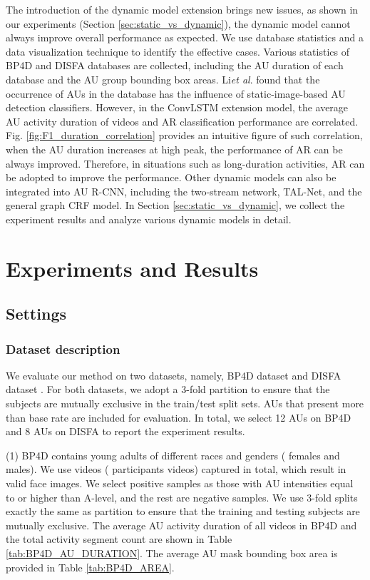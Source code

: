 \documentclass[5p,twocolumn]{elsarticle}
\newcommand{\etal}{\textit{et al}. }
\begin{document}
The introduction of the dynamic model extension brings new issues, as shown in our experiments (Section \ref{sec:static_vs_dynamic}), the dynamic model cannot always improve overall performance as expected. We use database statistics and a data visualization technique to identify the effective cases. Various statistics of BP4D and DISFA databases are collected, including the AU duration of each database and the AU group bounding box areas. Li\etal \cite{li2017eac} found that the occurrence of AUs in the database has the influence of static-image-based AU detection classifiers. However, in the ConvLSTM extension model, the average AU activity duration of videos and AR classification performance are correlated. Fig. \ref{fig:F1_duration_correlation} provides an intuitive figure of such correlation, when the AU duration increases at high peak, the performance of AR can be always improved. Therefore, in situations such as long-duration activities, AR can be adopted to improve the performance. Other dynamic models can also be integrated into AU R-CNN, including the two-stream network, TAL-Net, and the general graph CRF model. In Section  \ref{sec:static_vs_dynamic}, we collect the experiment results and analyze various dynamic models in detail. 

\section{Experiments and Results}
\label{sec:Experiment}
\subsection{Settings}
\subsubsection{Dataset description}
We evaluate our method on two datasets, namely, BP4D dataset \cite{zhang2014bp4d} and DISFA dataset \cite{mavadati2013disfa}. For both datasets, we adopt a 3-fold partition to ensure that the subjects are mutually exclusive in the train/test split sets. AUs that present more than  base rate are included for evaluation. In total, we select 12 AUs on BP4D and 8 AUs on DISFA to report the experiment results. 

(1) BP4D \cite{zhang2014bp4d} contains  young adults of different races and genders ( females and  males). We use  videos ( participants  videos) captured in total, which result in  valid face images. We select positive samples as those with AU intensities equal to or higher than A-level, and the rest are negative samples. We use 3-fold splits exactly the same as \cite{li2017eac,li2017action} partition to ensure that the training and testing subjects are mutually exclusive. The average AU activity duration of all videos in BP4D and the total activity segment count are shown in Table \ref{tab:BP4D_AU_DURATION}. The average AU mask bounding box area is provided in Table \ref{tab:BP4D_AREA}.
\end{document}
